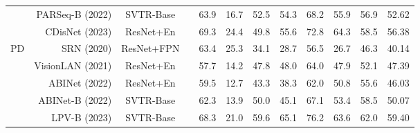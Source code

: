 \documentclass[10pt,journal,compsoc]{IEEEtran}
\begin{document}
\begin{table*}[t]
{\begin{tabular}{c|r|c|c|ccccccc|c}
                      & PARSeq-B \cite{BautistaA22PARSeq} (2022) & SVTR-Base   &    & 63.9                 & 16.7                                                      & 52.5                 & 54.3                 & 68.2                 & 55.9                                                   & 56.9                 & 52.62                                             \\
                      & CDisNet \cite{zheng2023cdistnet} (2023) & ResNet+En   &    & 69.3                 & 24.4                                                      & 49.8                 & 55.6                 & 72.8                 & 64.3                                                   & 58.5                 & 56.38                                             \\
                      \hline
\multirow{4}{*}{PD}   & SRN \cite{yu2020srn} (2020)   & ResNet+FPN   &       & 63.4                 & 25.3                                                      & 34.1                 & 28.7                 & 56.5                 & 26.7                                                   & 46.3                 & 40.14                                             \\
                      & VisionLAN \cite{Wang_2021_visionlan} (2021) & ResNet+En   &    & 57.7                 & 14.2                                                      & 47.8                 & 48.0                 & 64.0                 & 47.9                                                   & 52.1                 & 47.39                                             \\
                      & ABINet  \cite{TPAMI2022ABINetPP} (2022) & ResNet+En  &      & 59.5                 & 12.7                                                      & 43.3                 & 38.3                 & 62.0                 & 50.8                                                   & 55.6                 & 46.03                                             \\
                      & ABINet-B \cite{TPAMI2022ABINetPP} (2022) & SVTR-Base  &      & 62.3                 & 13.9                                                      & 50.0                 & 45.1                 & 67.1                 & 53.4                                                   & 58.5                 & 50.07                                             \\
                      & LPV-B \cite{ijcai2023LPV} (2023) & SVTR-Base  &      & 68.3                 & 21.0                                                      & 59.6                 & 65.1                 & 76.2                 & 63.6                                                   & 62.0                 & 59.40                                             \\

\end{tabular}}
\end{table*}
\end{document}
